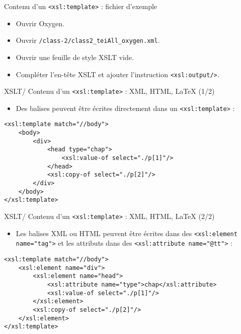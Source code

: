 \documentclass{beamer}
\begin{document}
     \begin{frame}{Contenu d'un \texttt{<xsl:template>} : fichier d'exemple}
         \Large
         \begin{itemize}
            \item Ouvrir Oxygen.
             \item Ouvrir \texttt{/class-2/class2\_teiAll\_oxygen.xml}.
             \item Ouvrir une feuille de style XSLT vide.
             \item Compléter l'en-tête XSLT et ajouter l'instruction \texttt{<xsl:output/>}.
         \end{itemize}
     \end{frame}

     \begin{frame}[fragile]{XSLT/ Contenu d'un \texttt{<xsl:template>} : XML, HTML, \LaTeX{} (1/2)}
     \Large
        \begin{itemize}
            \item Des balises peuvent être écrites directement dans un \texttt{<xsl:template>} :
        \end{itemize}
        \normalsize
         \begin{verbatim}
<xsl:template match="//body">
    <body>
        <div>
            <head type="chap">
                <xsl:value-of select="./p[1]"/>
            </head>
            <xsl:copy-of select="./p[2]"/>
        </div>
    </body>
</xsl:template>
         \end{verbatim}
     \end{frame}

     \begin{frame}[fragile]{XSLT/ Contenu d'un \texttt{<xsl:template>} : XML, HTML, \LaTeX{} (2/2)}
     \Large
        \begin{itemize}
            \item Les balises XML ou HTML peuvent être écrites dans des \texttt{<xsl:element name="tag">} et les attributs dans des \texttt{<xsl:attribute name="@tt">} :
        \end{itemize}
        \normalsize
         \begin{verbatim}
<xsl:template match="//body">
    <xsl:element name="div">
        <xsl:element name="head">
            <xsl:attribute name="type">chap</xsl:attribute>
            <xsl:value-of select="./p[1]"/>
        </xsl:element>
        <xsl:copy-of select="./p[2]"/>
    </xsl:element>
</xsl:template>
         \end{verbatim}
     \end{frame}
\end{document}
